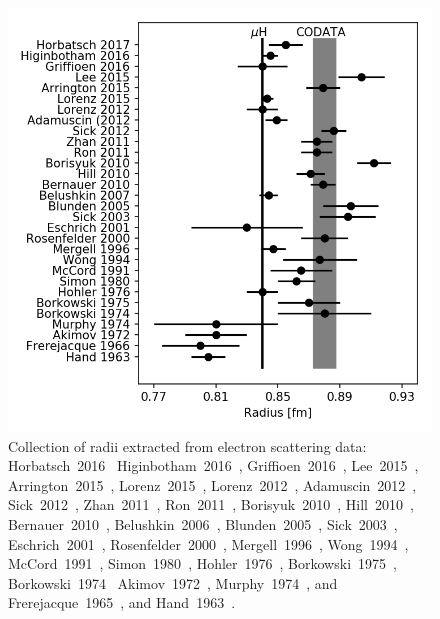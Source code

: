 \documentclass[10pt,aps,prc,twocolumn]{revtex4-1}
\begin{document}
\begin{figure}[htb]
\includegraphics[width=\columnwidth]{Figure/ScatteringResults.png}
\caption{Collection of radii extracted from electron scattering data:  
Horbatsch~2016~{\cite{Horbatsch:2016ilr}}
Higinbotham~2016~{\cite{Higinbotham:2015rja}},
Griffioen~2016~{\cite{Griffioen:2015hta}},
Lee~2015~{\cite{Lee:2015jqa}},
Arrington~2015~{\cite{Arrington:2015ria}},
Lorenz~2015~{\cite{Lorenz:2014yda,Lorenz:2014vha}},
Lorenz~2012~{\cite{Lorenz:2012tm}},
Adamuscin~2012~{\cite{Adamuscin:2012zz}},
Sick~2012~{\cite{Sick:2012zz}},
Zhan~2011~{\cite{Zhan:2011ji}},
Ron~2011~{\cite{Ron:2011rd}},
Borisyuk~2010~{\cite{Borisyuk:2009mg}},
Hill~2010~{\cite{Hill:2010yb}},
Bernauer~2010~{\cite{Bernauer:2010wm}},
Belushkin~2006~{\cite{Belushkin:2006qa}},
Blunden~2005~{\cite{Blunden:2005jv}},
Sick~2003~{\cite{Sick:2003gm}},
Eschrich~2001~\cite{GoughEschrich:2001ji},
Rosenfelder~2000~{\cite{Rosenfelder:1999cd}},
Mergell~1996~{\cite{Mergell:1995bf}},
Wong~1994~\cite{Wong:1994sy},
McCord~1991~\cite{McCord:1991sd},
Simon~1980~\cite{Simon:1980hu},
Hohler~1976~\cite{Hohler:1976ax},
Borkowski~1975~\cite{Borkowski:1975},
Borkowski~1974~\cite{Borkowski:1974tm,Borkowski:1974mb}
Akimov~1972~\cite{Akimov:1972nu},
Murphy~1974~\cite{Murphy:1974zz}, and
Frerejacque~1965~\cite{Frerejacque:1965ic}, and
Hand~1963~\cite{Hand:1963zz}.}
\label{collection}
\end{figure}
\end{document}
